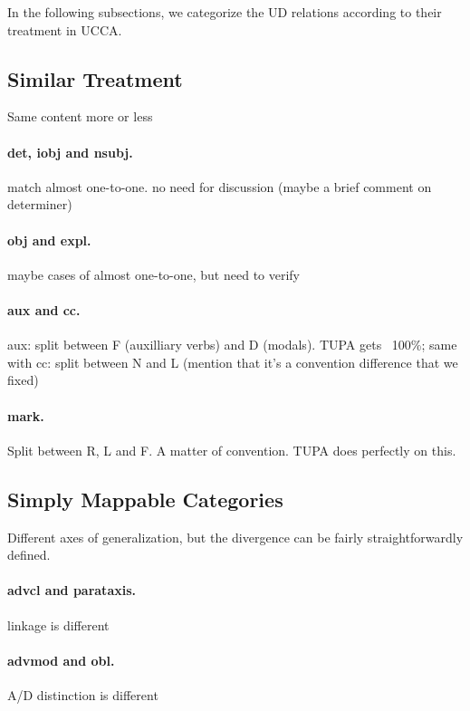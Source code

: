 \documentclass[11pt,a4paper]{article}
\begin{document}
In the following subsections, we categorize the UD relations according to their
treatment in UCCA.


\subsection{Similar Treatment}
Same content more or less

\paragraph{det, iobj and nsubj.}
match almost one-to-one. no need for discussion (maybe a brief comment on determiner)

\paragraph{obj and expl.}
maybe cases of almost one-to-one, but need to verify

\paragraph{aux and cc.}
aux: split between F (auxilliary verbs) and D (modals). TUPA gets ~100\%; same with cc: split between N and L (mention that it's a convention difference that we fixed)

\paragraph{mark.}
Split between R, L and F. A matter of convention. TUPA does perfectly on this.



\subsection{Simply Mappable Categories}

Different axes of generalization, but the divergence can be fairly straightforwardly defined.

\paragraph{advcl and parataxis.}
linkage is different

\paragraph{advmod and obl.}
A/D distinction is different
\end{document}
